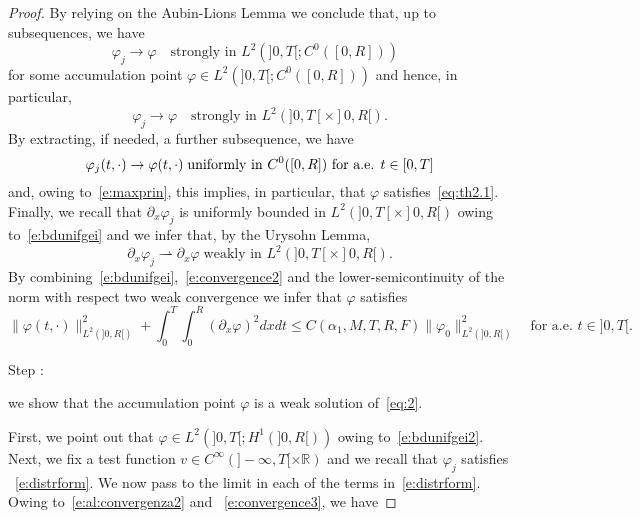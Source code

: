 \documentclass[11pt,leqno]{amsart}
\newcounter{stepnb}
\numberwithin{equation}{section}
\begin{document}
\begin{proof}
By relying on the Aubin-Lions Lemma we conclude that, up to subsequences, we have 
\begin{equation}
\label{e:al:convergenza1}
   {\varphi}_j  \to {\varphi}  \quad 
   \text{strongly in $L^2 (]0, T[; C^0 ([0, R]))$ }
\end{equation}
for some accumulation point  ${\varphi}  \in L^2 (]0, T[; C^0 ([0, R]))$
and hence, in particular, 
\begin{equation}
\label{e:al:convergenza2}
   {\varphi}_j  \to {\varphi}  \quad 
   \text{strongly in $L^2 (]0, T[ \times ]0, R[)$}.
\end{equation}
By extracting, if needed, a further subsequence, we have 
\begin{equation}
 {\varphi}_j (t, \cdot) \to {\varphi} (t, \cdot) 
     \; \text{uniformly in $ C^0 ([0, R])$ for a.e. $t \in [0, T]$}
     \\
     \label{e:convergence2} 
\end{equation}
and, owing to~\eqref{e:maxprin}, this implies, in particular, that ${\varphi}$ satisfies~\eqref{eq:th2.1}.  
Finally, we recall that ${\partial_x } {\varphi}_j$ is uniformly bounded in $L^2 (]0, T[ \times ]0, R[)$ owing to~\eqref{e:bdunifgei} and we infer that, by the Urysohn Lemma,
\begin{equation}
\label{e:convergence3}
     \partial_x {\varphi}_j {\rightharpoonup} \partial_x {\varphi} \;   
     \text{weakly in $L^2 ( ]0, T[ \times ]0, R[)$}.   
\end{equation}
By combining~\eqref{e:bdunifgei},~\eqref{e:convergence2} and the lower-semicontinuity of the norm with respect two weak convergence we infer that
${\varphi}$ satisfies 
\begin{equation}
\label{e:bdunifgei2}
  \| {\varphi} (t, \cdot)\|^2_{L^2 (]0, R[)}
  + \int_0^T \int_0^R ({\partial_x } {\varphi})^2 dx dt \leq 
  C(\alpha_1, M, T, R, F)  \| {\varphi}_0 \|^2_{L^2 (]0, R[)}
  \quad \text{for a.e. $t \in ]0, T[$}. 
\end{equation}
{{{\sc \addtocounter{stepnb}{1}\noindent  Step :} {we show that the accumulation point ${\varphi}$ is a weak solution of~\eqref{eq:2}}.}}
First, we point out that ${\varphi} \in L^2 (]0, T[; H^1 (]0, R[))$ owing to~\eqref{e:bdunifgei2}.
Next, we fix a test function $v \in C^\infty (]- \infty, T[ \times {\mathbb{R}})$ and we recall that ${\varphi}_j$ satisfies ~\eqref{e:distrform}. We now pass to the limit in each of the terms in~\eqref{e:distrform}. 
Owing to~\eqref{e:al:convergenza2} and ~\eqref{e:convergence3}, we have 

\end{proof}
\end{document}
